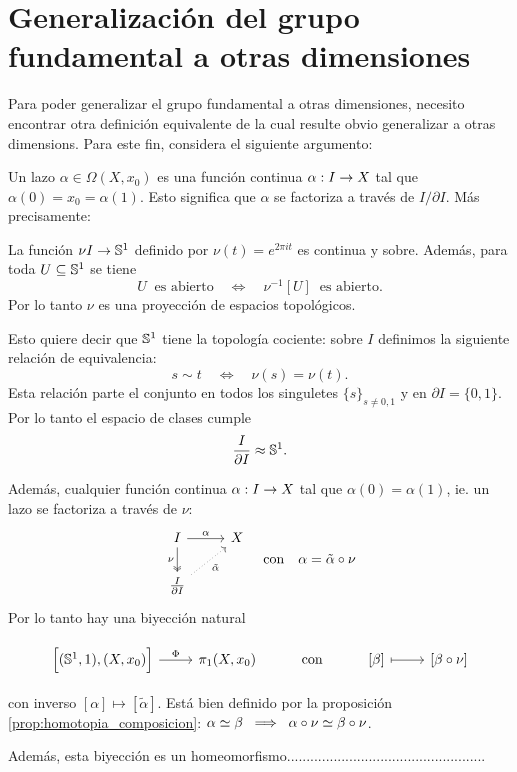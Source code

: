 \documentclass[../../topologia_algebraica]{subfiles}
\begin{document}
\section{Generalizaci\'on del grupo fundamental a otras dimensiones}

Para poder generalizar el grupo fundamental a otras dimensiones, necesito encontrar otra definici\'on
equivalente de la cual resulte obvio generalizar a otras dimensions.
Para este fin, considera el siguiente argumento:

Un lazo $\alpha\in\Omega(X,x_0)$ es una funci\'on continua $\alpha:I\rightarrow X$ tal que
$\alpha(0)=x_0=\alpha(1)$. Esto significa que $\alpha$ se factoriza a trav\'es
de $I/\partial I$. M\'as precisamente:

La funci\'on $\nu I\rightarrow \mathbb{S}^1$ definido por $\nu(t)=e^{2\pi i t}$ es continua y sobre. Adem\'as,
para toda $U\subseteq\mathbb{S}^1$ se tiene
\[
  U\;\;\text{es abierto} \quad\iff\quad \nu^{-1}[U]\;\; \text{es abierto}.
\]
Por lo tanto $\nu$ es una proyecci\'on de espacios topol\'ogicos.

Esto quiere decir que $\mathbb{S}^1$ tiene la topolog\'ia cociente: sobre $I$ definimos la siguiente
relaci\'on de equivalencia:
\[
  s\sim t \quad\iff\quad \nu(s)=\nu(t).
\]
Esta relaci\'on parte el conjunto en todos los singuletes $\{s\}_{s\neq0,1}$ y en $\partial I=\{0,1\}$.
Por lo tanto el espacio de clases cumple
\[
  \frac{I}{\partial I}\approx \mathbb{S}^1.
\]

Adem\'as, cualquier funci\'on continua $\alpha:I \rightarrow X$ tal que $\alpha(0)=\alpha(1)$, ie. un lazo
se factoriza a trav\'es de $\nu$:
\[
  \begin{tikzcd}
   I \arrow[r,"\alpha"] \arrow[d,twoheadrightarrow,"\nu"'] & X \\
   \frac{I}{\partial I} \arrow[ur,dotted,"\tilde{\alpha}"'] & 
 \end{tikzcd}
 \quad\text{con}\quad \alpha=\tilde{\alpha}\circ\nu
\]
Por lo tanto hay una biyecci\'on natural

\[
  \begin{tikzcd}
    \Big[(\Sn^1,1),(X,x_0)\Big] \arrow[r,"\Phi"] & \pi_1(X,x_0) & \text{con}
    & \text{[}\beta\text{]} \arrow[r,mapsto] & \text{[}\beta\circ\nu\text{]}
  \end{tikzcd}
\]

con inverso $[\alpha]\mapsto[\tilde{\alpha}]$. Est\'a bien definido por la proposici\'on
\ref{prop:homotopia_composicion}: $\alpha\simeq\beta\;\;\Longrightarrow\;\; \alpha\circ\nu \simeq \beta\circ\nu$.

Adem\'as, esta biyecci\'on es un homeomorfismo...................................................
\end{document}
